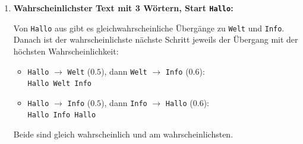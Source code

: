 \begin{frame}
\begin{enumerate}
              Beide sind gleich wahrscheinlich und am wahrscheinlichsten.

              \textbf{Übergangsmatrix:}

              Für jede Zeile normieren wir auf die Summe der Übergänge von diesem Wort:

              \[
                  P = \begin{pmatrix}
                                     & \texttt{Hallo} & \texttt{Welt} & \texttt{Info} \\
                      \texttt{Hallo} & 0              & \frac{3}{6}   & \frac{3}{6}   \\
                      \texttt{Welt}  & \frac{2}{5}    & 0             & \frac{3}{5}   \\
                      \texttt{Info}  & \frac{3}{5}    & \frac{2}{5}   & 0             \\
                  \end{pmatrix}
              \]

        \item \textbf{Wahrscheinlichster Text mit 3 Wörtern, Start \texttt{Hallo}:}

              Von \texttt{Hallo} aus gibt es gleichwahrscheinliche Übergänge zu \texttt{Welt} und \texttt{Info}. Danach ist der wahrscheinlichste nächste Schritt jeweils der Übergang mit der höchsten Wahrscheinlichkeit:

              \begin{itemize}
                  \item \texttt{Hallo} $\rightarrow$ \texttt{Welt} ($0.5$), dann \texttt{Welt} $\rightarrow$ \texttt{Info} ($0.6$):\\
                        \texttt{Hallo Welt Info}
                  \item \texttt{Hallo} $\rightarrow$ \texttt{Info} ($0.5$), dann \texttt{Info} $\rightarrow$ \texttt{Hallo} ($0.6$):\\
                        \texttt{Hallo Info Hallo}
              \end{itemize}

              Beide sind gleich wahrscheinlich und am wahrscheinlichsten.
    \end{enumerate}
\end{frame}


